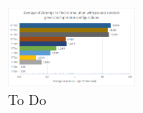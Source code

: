 \begin{figure}[ht]
\centering
\includegraphics[width=0.3\textwidth]{figuras/graphs/find_ones_avg.png}
\caption{To Do}
\label{gph:find_ones_avg}
\end{figure}